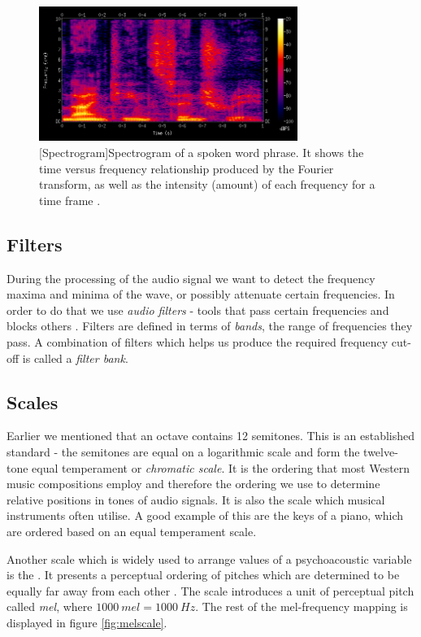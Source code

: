 \begin{figure}[H]
    \centering
    \includegraphics[width=0.75\textwidth]{BackgroundTheory/spectrogram.png}
    [Spectrogram]{Spectrogram of a spoken word phrase. It shows the time versus frequency relationship produced by the Fourier transform, as well as the intensity (amount) of each frequency for a time frame \cite{wiki:spectrogram}.}
    \label{fig:spectrogram}
\end{figure}

\subsection{Filters}
\label{subsec:filters}
During the processing of the audio signal we want to detect the frequency maxima
and minima of the wave, or possibly attenuate certain frequencies. In order to
do that we use \textit{audio filters} - tools that pass certain frequencies and
blocks others \cite{filters}. Filters are defined in terms of \textit{bands},
the range of frequencies they pass. A combination of filters which helps us
produce the required frequency cut-off is called a \textit{filter bank}.

\subsection{Scales}
\label{subsec:scales}
Earlier we mentioned that an octave contains 12 semitones. This is an
established standard - the semitones are equal on a logarithmic scale and form
the twelve-tone equal temperament or \textit{chromatic scale}. It is the
ordering that most Western music compositions employ and therefore the ordering
we use to determine relative positions in tones of audio signals. It is also the
scale which musical instruments often utilise. A good example of this are the
keys of a piano, which are ordered based on an equal temperament scale.

Another scale which is widely used to arrange values of a psychoacoustic
variable is the . It presents a perceptual ordering of pitches
which are determined to be equally far away from each other
\cite{stevens1937scale}. The scale introduces a unit of perceptual pitch called
\textit{mel}, where $1000\:mel = 1000\:Hz$. The rest of the mel-frequency
mapping is displayed in figure \ref{fig:melscale}.


